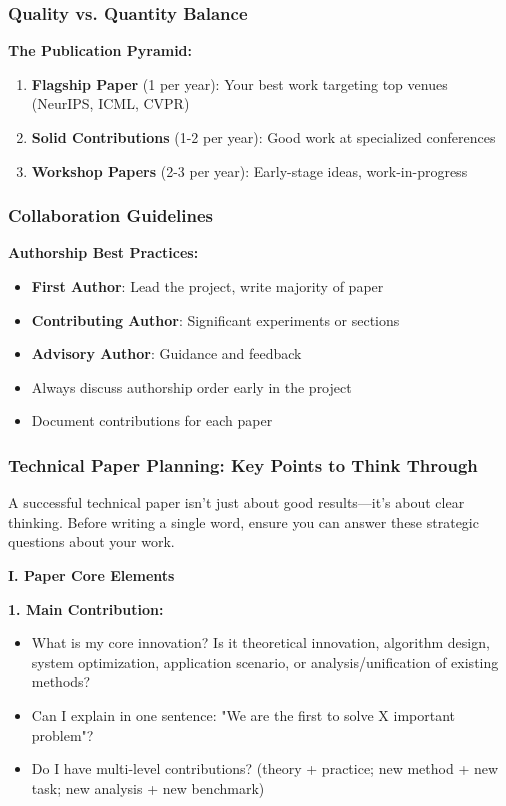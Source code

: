 \documentclass[11pt,a4paper]{article}
\begin{document}
\subsubsection{Quality vs. Quantity Balance}

\textbf{The Publication Pyramid:}
\begin{enumerate}
    \item \textbf{Flagship Paper} (1 per year): Your best work targeting top venues (NeurIPS, ICML, CVPR)
    \item \textbf{Solid Contributions} (1-2 per year): Good work at specialized conferences
    \item \textbf{Workshop Papers} (2-3 per year): Early-stage ideas, work-in-progress
\end{enumerate}

\subsubsection{Collaboration Guidelines}

\textbf{Authorship Best Practices:}
\begin{itemize}
    \item \textbf{First Author}: Lead the project, write majority of paper
    \item \textbf{Contributing Author}: Significant experiments or sections
    \item \textbf{Advisory Author}: Guidance and feedback
    \item Always discuss authorship order early in the project
    \item Document contributions for each paper
\end{itemize}

\subsubsection{Technical Paper Planning: Key Points to Think Through}

\begin{tcolorbox}[colback=blue!5,colframe=darkblue,title=Before You Start Writing a Technical Paper]
A successful technical paper isn't just about good results—it's about clear thinking. Before writing a single word, ensure you can answer these strategic questions about your work.
\end{tcolorbox}

\textbf{I. Paper Core Elements}

\textbf{1. Main Contribution:}
\begin{itemize}
    \item What is my core innovation? Is it theoretical innovation, algorithm design, system optimization, application scenario, or analysis/unification of existing methods?
    \item Can I explain in one sentence: "We are the first to solve X important problem"?
    \item Do I have multi-level contributions? (theory + practice; new method + new task; new analysis + new benchmark)
\end{itemize}
\end{document}
